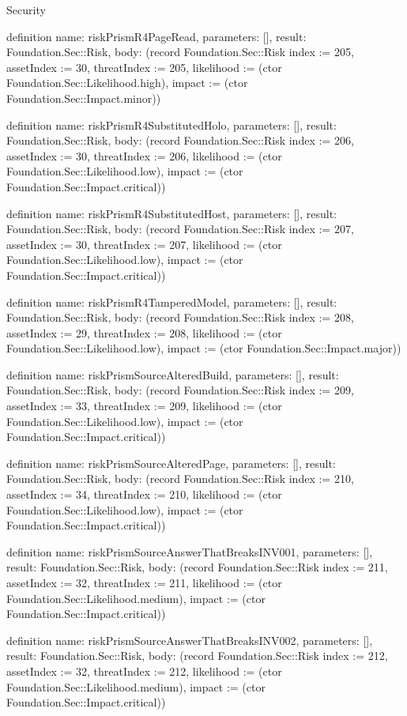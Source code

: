 \begin{lexlean}{Security}
\begin{semanticmodule}
definition{
  name: riskPrismR4PageRead,
  parameters: [],
  result: Foundation.Sec::Risk,
  body: (record Foundation.Sec::Risk {index := 205, assetIndex := 30, threatIndex := 205, likelihood := (ctor Foundation.Sec::Likelihood.high), impact := (ctor Foundation.Sec::Impact.minor)})
}

definition{
  name: riskPrismR4SubstitutedHolo,
  parameters: [],
  result: Foundation.Sec::Risk,
  body: (record Foundation.Sec::Risk {index := 206, assetIndex := 30, threatIndex := 206, likelihood := (ctor Foundation.Sec::Likelihood.low), impact := (ctor Foundation.Sec::Impact.critical)})
}

definition{
  name: riskPrismR4SubstitutedHost,
  parameters: [],
  result: Foundation.Sec::Risk,
  body: (record Foundation.Sec::Risk {index := 207, assetIndex := 30, threatIndex := 207, likelihood := (ctor Foundation.Sec::Likelihood.low), impact := (ctor Foundation.Sec::Impact.critical)})
}

definition{
  name: riskPrismR4TamperedModel,
  parameters: [],
  result: Foundation.Sec::Risk,
  body: (record Foundation.Sec::Risk {index := 208, assetIndex := 29, threatIndex := 208, likelihood := (ctor Foundation.Sec::Likelihood.low), impact := (ctor Foundation.Sec::Impact.major)})
}

definition{
  name: riskPrismSourceAlteredBuild,
  parameters: [],
  result: Foundation.Sec::Risk,
  body: (record Foundation.Sec::Risk {index := 209, assetIndex := 33, threatIndex := 209, likelihood := (ctor Foundation.Sec::Likelihood.low), impact := (ctor Foundation.Sec::Impact.critical)})
}

definition{
  name: riskPrismSourceAlteredPage,
  parameters: [],
  result: Foundation.Sec::Risk,
  body: (record Foundation.Sec::Risk {index := 210, assetIndex := 34, threatIndex := 210, likelihood := (ctor Foundation.Sec::Likelihood.low), impact := (ctor Foundation.Sec::Impact.critical)})
}

definition{
  name: riskPrismSourceAnswerThatBreaksINV001,
  parameters: [],
  result: Foundation.Sec::Risk,
  body: (record Foundation.Sec::Risk {index := 211, assetIndex := 32, threatIndex := 211, likelihood := (ctor Foundation.Sec::Likelihood.medium), impact := (ctor Foundation.Sec::Impact.critical)})
}

definition{
  name: riskPrismSourceAnswerThatBreaksINV002,
  parameters: [],
  result: Foundation.Sec::Risk,
  body: (record Foundation.Sec::Risk {index := 212, assetIndex := 32, threatIndex := 212, likelihood := (ctor Foundation.Sec::Likelihood.medium), impact := (ctor Foundation.Sec::Impact.critical)})
}


\end{semanticmodule}
\end{lexlean}
